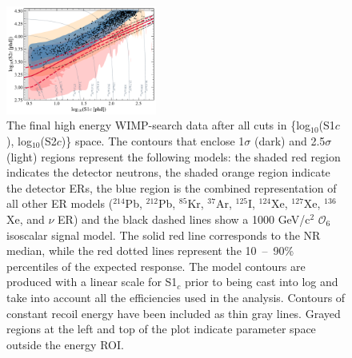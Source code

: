 \documentclass[reprint, showpacs,
preprintnumbers,
amsmath,amssymb,
aps, floatfix,
superscriptaddress,
prd, nofootinbib]{revtex4-1}
\begin{document}
\begin{figure}[ht]
    \centering
    \includegraphics[trim={8 5 5 5},clip, width=0.44\textwidth]{logs1logs2_SR1_EFT_06s_1000GeV_0keV_paperPlot}
\caption{The final high energy WIMP-search data after all cuts in \{log$_{10}$(S1$c$), log$_{10}$(S2$c$)\} space. 
    The contours that enclose 1$\sigma$ (dark) and 2.5$\sigma$ (light) regions represent the following models: 
    the shaded red region indicates the detector neutrons, the shaded orange region indicate the detector ERs, the blue region is the combined representation of all other ER models (${}^{214}$Pb, ${}^{212}$Pb, ${}^{85}$Kr, ${}^{37}$Ar,  ${}^{125}$I, ${}^{124}$Xe, ${}^{127}$Xe, ${}^{136}$Xe, and $\nu$ ER) and the black dashed lines show a 1000 GeV/c$^2$ $\mathcal{O}_6$ isoscalar signal model. 
    The solid red line corresponds to the NR median, while the red dotted lines represent the 10~--~90\% percentiles of the expected response.
    The model contours are produced with a linear scale for S1$_c$ prior to being cast into log and take into account all the efficiencies used in the analysis. Contours of constant recoil energy have been included as thin gray lines. Grayed regions at the left and top of the plot indicate parameter space outside the energy ROI.
}

    \label{fig:data-ROI}
\end{figure}
\end{document}
